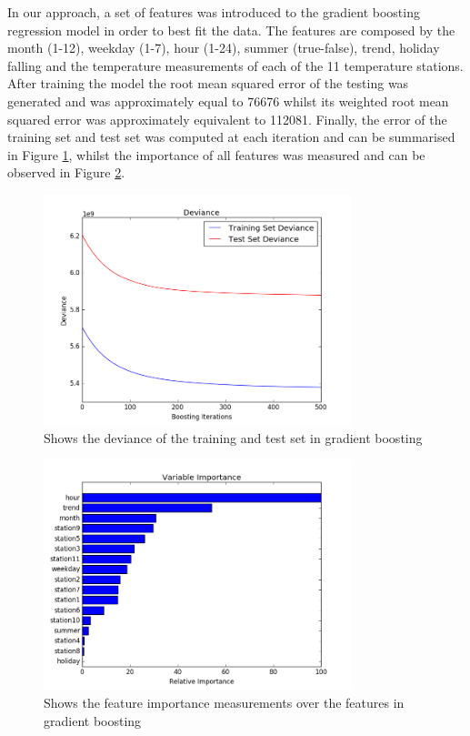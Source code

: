 \documentclass{article} %
\begin{document}
In our approach, a set of features was introduced to the gradient boosting regression model in order to best fit the data. The features are composed by the month (1-12), weekday (1-7), hour (1-24), summer (true-false), trend, holiday falling and the temperature measurements of each of the 11 temperature stations. After training the model the root mean squared error of the testing was generated and was approximately equal to 76676 whilst its weighted root mean squared error was approximately equivalent to 112081. Finally, the error of the training set and test set was computed at each iteration and can be summarised in Figure \ref{fig:deviance}, whilst the importance of all features was measured and can be observed in Figure \ref{fig:boost_imp}.
\begin{figure}
  \centering
    \includegraphics[width=0.80\textwidth]{deviance}
  \caption{Shows the deviance of the training and test set in gradient boosting}
  \label{fig:deviance}
\end{figure}
\begin{figure}
  \centering
    \includegraphics[width=0.80\textwidth]{boost_imp}
  \caption{Shows the feature importance measurements over the features in gradient boosting}
  \label{fig:boost_imp}
\end{figure}
\end{document}
